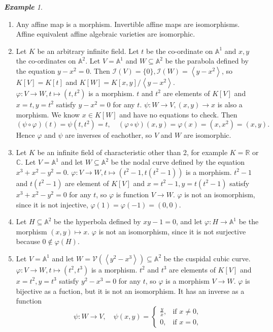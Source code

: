 \documentclass[titlepage]{article}
\theoremstyle{remark}
\newtheorem{example}[definition]{\textbf{Example}}
\renewcommand{\phi}{\varphi}
\begin{document}
  \begin{example}$ $
    \begin{enumerate}
      \item 
        Any affine map is a morphism. Invertible affine maps are isomorphisms. Affine equivalent affine algebraic varieties are isomorphic.
      \item 
        Let $K$ be an arbitrary infinite field. Let $t$ be the co-ordinate on $\mathbb{A}^1$ and $x,y$ the co-ordinates on $\mathbb{A}^2$. Let $V=\mathbb{A}^1$ and $W\subseteq \mathbb{A}^2$ be the parabola defined by the equation $y-x^2=0$. Then $\mathcal{I}(V)=\{0\}, \mathcal{I}(W)=\left\langle y-x^2\right\rangle$, so $K[V]=K[t]$ and $K[W]=K[x,y]/\left\langle y-x^2\right\rangle$.\\
        $\phi:V\to W, t\mapsto(t,t^2)$ is a morphism. $t$ and $t^2$ are elements of $K[V]$ and $x=t,y=t^2$ satisfy $y-x^2=0$ for any $t$.
        $\psi:W\to V, (x,y)\to x$ is also a morphism. We know $x\in K[W]$ and have no equations to check. Then
        \[(\psi\circ\phi)(t)=\psi(t,t^2)=t,\quad(\phi\circ\psi)(x,y)=\phi(x)=(x,x^2)=(x,y).\]
        Hence $\phi$ and $\psi$ are inverses of eachother, so $V$ and $W$ are isomorphic.
      \item 
        Let $K$ be an infinite field of characteristic other than 2, for example $K=\mathbb{R}$ or $\mathbb{C}$. Let $V=\mathbb{A}^1$ and let $W\subseteq\mathbb{A}^2$ be the nodal curve defined by the equation $x^3+x^2-y^2=0$. $\phi:V\to W,t\mapsto(t^2-1,t(t^2-1))$ is a morphism. $t^2-1$ and $t(t^2-1)$ are element of $K[V]$ and $x=t^2-1,y=t(t^2-1)$ satisfy $x^3+x^2-y^2=0$ for any $t$, so $\phi$ is function $V\to W$. $\phi$ is not an isomorphism, since it is not injective, $\phi(1)=\phi(-1)=(0,0)$.
      \item 
        Let $H\subseteq \mathbb{A}^2$ be the hyperbola defined by $xy-1=0$, and let $\phi:H\to \mathbb{A}^1$ be the morphism $(x,y)\mapsto x$. $\phi$ is not an isomorphism, since it is not surjective because $0\notin\phi(H)$.
      \item 
        Let $V=\mathbb{A}^1$ and let $W=\mathcal{V}(\left\langle y^2-x^3\right\rangle)\subseteq \mathbb{A}^2$ be the cuspidal cubic curve. $\phi:V\to W, t\mapsto(t^2,t^3)$ is a morphism. $t^2$ and $t^3$ are elements of $K[V]$ and $x=t^2,y=t^3$ satisfy $y^2-x^3=0$ for any $t$, so $\phi$ is a morphism $V\to W$. $\phi$ is bijective as a fuction, but it is not an isomorphism. It has an inverse as a function
        \[\psi:W\to V,\quad\psi(x,y)=\begin{cases}\frac{y}{x},&\text{if }x\ne 0,\\ 0,&\text{if }x=0,\end{cases}\]

\end{enumerate}
\end{example}
\end{document}

